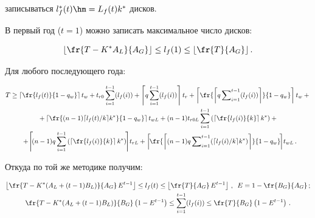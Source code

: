 записываться $l_f^*(t)\hm= L_f(t) k^*$ дисков.


  


  В первый год ($t = 1$) можно записать максимальное число дисков:


  $$


  \left\lfloor \fr{T-K^*A_L}{A_G}\right\rfloor \leq l_f(1)\leq \left\lfloor 


\fr{T}{A_G}\right\rfloor.


  $$


  


  Для любого последующего года:


  


  \noindent


  \begin{multline}


  T\geq \left\lceil \fr{l_f(t)}{1-q_w}\right\rceil t_w +t_{r0} \sum\limits_{i=1}^{t-1} 


(l_f(i))+\left\lceil q\sum\limits_{i=1}^{t-1} (l_f(i))\right\rceil t_r + \left\lceil \fr{\left\lceil q


\sum\nolimits_{i=1}^{t-1} (l_f(i))\right\rceil}{1-q_w}\right\rceil t_w+{}\\


{}+


  \left\lceil \fr{(n-1)\lceil l_f(t)/k\rceil k^*}{1-q_w}\right\rceil t_{wL}+


(n-1) t_{r0L} \sum\limits_{i=1}^{t-1} \left( \left\lceil \fr{l_f(i)}{k}\right\rceil 


k^*\right)+ {}\\


\!{}+\!\left\lceil\! (n-1) q \sum\limits_{i=1}^{t-1} \left( \left\lceil 


\fr{l_f(i)}{k}\right\rceil k^*\right) \!\right\rceil\! t_{rL}+ 


  \left\lceil \!\fr{\left\lceil (n-1)q\sum\nolimits_{i=1}^{t-1} ( \lceil l_f(i)/k\rceil 


k^*)\right\rceil}{1-q_w}\!\right\rceil\! t_{wL}\,.\!\!\!


  \label{e4-che}


  \end{multline}


    Откуда по той же методике получим:


  \begin{gather}


  \left\lfloor \fr{T-K^*(A_L+(t-1)B_L)}{A_G}\,E^{t-1}\right\rfloor \leq l_f(t)\leq 


\left\lfloor \fr{T}{A_G}\,E^{t-1}\right\rfloor\,,\enskip E=1-\fr{B_G}{A_G}\,;


\label{e5-che}\\


  \fr{T-K^*(A_L+(t-1)B_L)}{B_G}\left(1-E^{t-1}\right) 


\leq \sum\limits_{i=1}^{t-1} (l_f(i))\leq \fr{T}{B_G}\left(1-E^{t-1}\right)\,.


  \label{e6-che}


  \end{gather}


